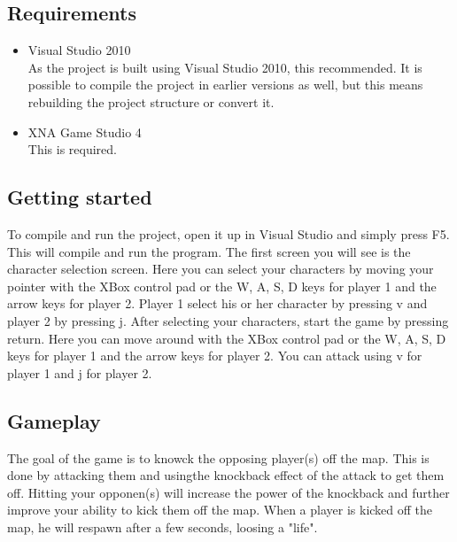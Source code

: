 \subsection{Requirements}
\begin{itemize}
\item Visual Studio 2010 \cite{bib:visualstudio}\\
As the project is built using Visual Studio 2010, this recommended. It is possible to compile the project in earlier versions as well, but this means rebuilding the project structure or convert it.

\item XNA Game Studio 4 \cite{bib:xna}\\
This is required.
\end{itemize}

\subsection{Getting started}
To compile and run the project, open it up in Visual Studio and simply press F5. This will compile and run the program. The first screen you will see is the character selection screen. Here you can select your characters by moving your pointer with the XBox control pad or the W, A, S, D keys for player 1 and the arrow keys for player 2. Player 1 select his or her character by pressing v and player 2 by pressing j. After selecting your characters, start the game by pressing return. Here you can move around with the XBox control pad or the W, A, S, D keys for player 1 and the arrow keys for player 2. You can attack using v for player 1 and j for player 2.

\subsection{Gameplay}
The goal of the game is to knowck the opposing player(s) off the map. This is done by attacking them and usingthe knockback effect of the attack to get them off. Hitting your opponen(s) will increase the power of the knockback and further improve your ability to kick them off the map. When a player is kicked off the map, he will respawn after a few seconds, loosing a "life".
